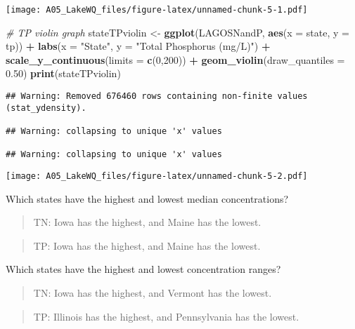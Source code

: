 \documentclass[]{article}
\newenvironment{Shaded}{\begin{snugshade}}{\end{snugshade}}
\newcommand{\CommentTok}[1]{\textcolor[rgb]{0.56,0.35,0.01}{\textit{#1}}}
\newcommand{\DataTypeTok}[1]{\textcolor[rgb]{0.13,0.29,0.53}{#1}}
\newcommand{\DecValTok}[1]{\textcolor[rgb]{0.00,0.00,0.81}{#1}}
\newcommand{\FloatTok}[1]{\textcolor[rgb]{0.00,0.00,0.81}{#1}}
\newcommand{\KeywordTok}[1]{\textcolor[rgb]{0.13,0.29,0.53}{\textbf{#1}}}
\newcommand{\NormalTok}[1]{#1}
\newcommand{\OperatorTok}[1]{\textcolor[rgb]{0.81,0.36,0.00}{\textbf{#1}}}
\newcommand{\StringTok}[1]{\textcolor[rgb]{0.31,0.60,0.02}{#1}}
\begin{document}
\texttt{[image: A05\_LakeWQ\_files/figure-latex/unnamed-chunk-5-1.pdf]}

\begin{Shaded}
\begin{Highlighting}[]
\CommentTok{# TP violin graph}
\NormalTok{stateTPviolin <-}\StringTok{ }\KeywordTok{ggplot}\NormalTok{(LAGOSNandP, }\KeywordTok{aes}\NormalTok{(}\DataTypeTok{x =}\NormalTok{ state, }\DataTypeTok{y =}\NormalTok{ tp)) }\OperatorTok{+}
\StringTok{  }\KeywordTok{labs}\NormalTok{(}\DataTypeTok{x =} \StringTok{"State"}\NormalTok{, }\DataTypeTok{y =} \StringTok{"Total Phosphorus (mg/L)"}\NormalTok{) }\OperatorTok{+}
\StringTok{  }\KeywordTok{scale_y_continuous}\NormalTok{(}\DataTypeTok{limits =} \KeywordTok{c}\NormalTok{(}\DecValTok{0}\NormalTok{,}\DecValTok{200}\NormalTok{)) }\OperatorTok{+}
\StringTok{  }\KeywordTok{geom_violin}\NormalTok{(}\DataTypeTok{draw_quantiles =} \FloatTok{0.50}\NormalTok{)}
\KeywordTok{print}\NormalTok{(stateTPviolin)}
\end{Highlighting}
\end{Shaded}

\begin{verbatim}
## Warning: Removed 676460 rows containing non-finite values (stat_ydensity).

## Warning: collapsing to unique 'x' values

## Warning: collapsing to unique 'x' values
\end{verbatim}

\texttt{[image: A05\_LakeWQ\_files/figure-latex/unnamed-chunk-5-2.pdf]}

Which states have the highest and lowest median concentrations?

\begin{quote}
TN: Iowa has the highest, and Maine has the lowest.
\end{quote}

\begin{quote}
TP: Iowa has the highest, and Maine has the lowest.
\end{quote}

Which states have the highest and lowest concentration ranges?

\begin{quote}
TN: Iowa has the highest, and Vermont has the lowest.
\end{quote}

\begin{quote}
TP: Illinois has the highest, and Pennsylvania has the lowest.
\end{quote}
\end{document}
